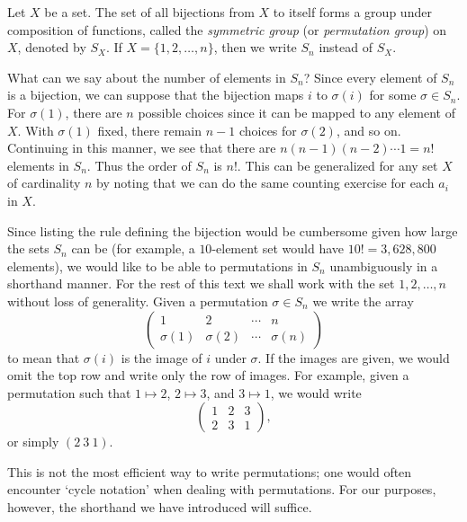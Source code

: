 \begin{example}
    \label{ex:symmetric-group}
    Let \(X\) be a set. The set of all bijections from \(X\) to itself forms a
    group under composition of functions, called the \emph{symmetric group} (or
    \emph{permutation group}) on \(X\), denoted by \(S_X\). If \(X = \{1, 2,
    \ldots, n\}\), then we write \(S_n\) instead of \(S_X\).

    What can we say about the number of elements in \(S_n\)? Since every element
    of \(S_n\) is a bijection, we can suppose that the bijection maps \(i\) to
    \(\sigma(i)\) for some \(\sigma \in S_n\). For \(\sigma(1)\), there are
    \(n\) possible choices since it can be mapped to any element of \(X\). With
    \(\sigma(1)\) fixed, there remain \(n-1\) choices for \(\sigma(2)\), and so
    on. Continuing in this manner, we see that there are \(n(n - 1)(n - 2)
    \cdots 1 = n!\) elements in \(S_n\). Thus the order of \(S_n\) is \(n!\).
    This can be generalized for any set \(X\) of cardinality \(n\) by noting
    that we can do the same counting exercise for each \(a_i\) in \(X\).

    Since listing the rule defining the bijection would be cumbersome given how
    large the sets \(S_n\) can be (for example, a \(10\)-element set would have
    \(10! = 3,628,800\) elements), we would like to be able to permutations in
    \(S_n\) unambiguously in a shorthand manner. For the rest of this text we
    shall work with the set \({1, 2, \ldots, n}\) without loss of generality.
    Given a permutation \(\sigma \in S_n\) we write the array
    \[
        \begin{pmatrix}
            1 & 2 & \cdots & n\\
            \sigma(1) & \sigma(2) & \cdots & \sigma(n)
        \end{pmatrix}
    \]
    to mean that \(\sigma(i)\) is the image of \(i\) under \(\sigma\). If the
    images are given, we would omit the top row and write only the row of
    images. For example, given a permutation such that \(1 \mapsto 2\), \(2
    \mapsto 3\), and \(3 \mapsto 1\), we would write
    \[
        \begin{pmatrix}
            1 & 2 & 3\\
            2 & 3 & 1
        \end{pmatrix},
    \]
    or simply \((2\ 3\ 1)\).

    This is not the most efficient way to write permutations; one would often
    encounter `cycle notation' when dealing with permutations. For our purposes,
    however, the shorthand we have introduced will suffice.


\end{example}
